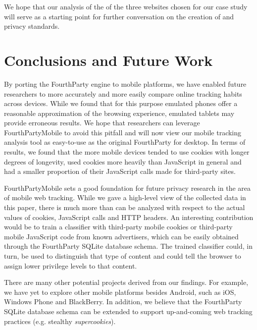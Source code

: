 \documentclass{acm_proc_article-sp}
\begin{document}
We hope that our analysis of the \pps of the three websites chosen for our case study will serve as a starting point for further conversation on the creation of \pps and privacy standards.

\newpage
\section{Conclusions and Future Work}

By porting the FourthParty engine to mobile platforms, we have enabled future researchers to more accurately and more easily compare online tracking habits across devices. While we found that for this purpose emulated phones offer a reasonable approximation of the browsing experience, emulated tablets may provide erroneous results. We hope that researchers can leverage FourthPartyMobile to avoid this pitfall and will now view our mobile tracking analysis tool as easy-to-use as the original FourthParty for desktop. In terms of results, we found that the more mobile devices tended to use cookies with longer degrees of longevity, used cookies more heavily than JavaScript in general and had a smaller proportion of their JavaScript calls made for third-party sites.

FourthPartyMobile sets a good foundation for future privacy research in the area of mobile web tracking. While we gave a high-level view of the collected data in this paper, there is much more than can be analyzed with respect to the actual values of cookies, JavaScript calls and HTTP headers. An interesting contribution would be to train a classifier with third-party mobile cookies or third-party mobile JavaScript code from known advertisers, which can be easily obtained through the FourthParty SQLite database schema. The trained classifier could, in turn, be used to distinguish that type of content and could tell the browser to assign lower privilege levels to that content.

There are many other potential projects derived from our findings. For example, we have yet to explore other mobile platforms besides Android, such as iOS, Windows Phone and BlackBerry. In addition, we believe that the FourthParty SQLite database schema can be extended to support up-and-coming web tracking practices (e.g. stealthy \emph{supercookies}\cite{supercookies}).

\nocite{*}


\end{document}
